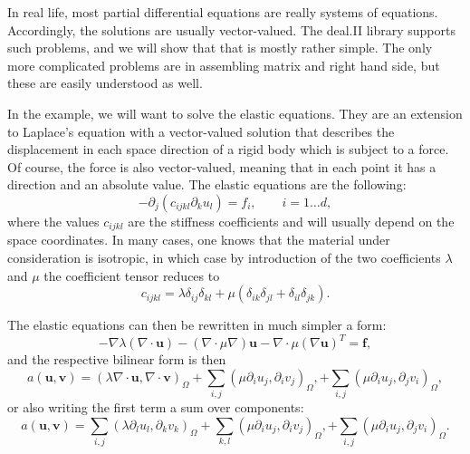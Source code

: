 \documentclass{article}
\renewcommand{\vec}[1]{{\mathbf #1}}
\renewcommand{\div}{\nabla \cdot}
\begin{document}
In real life, most partial differential equations are really systems
of equations. Accordingly, the solutions are usually
vector-valued. The deal.II library supports such problems, and we will show
that that is mostly rather simple. The only more complicated problems
are in assembling matrix and right hand side, but these are easily
understood as well. 

In the example, we will want to solve the elastic equations. They are
an extension to Laplace's equation with a vector-valued solution that
describes the displacement in each space direction of a rigid body
which is subject to a force. Of course, the force is also
vector-valued, meaning that in each point it has a direction and an
absolute value. The elastic equations are the following:
$$
  -
  \partial_j (c_{ijkl} \partial_k u_l)
  =
  f_i,
  \qquad
  i=1\ldots d,
$$
where the values $c_{ijkl}$ are the stiffness coefficients and
will usually depend on the space coordinates. In
many cases, one knows that the material under consideration is
isotropic, in which case by introduction of the two coefficients
$\lambda$ and $\mu$ the coefficient tensor reduces to
$$
  c_{ijkl} 
  =
  \lambda \delta_{ij} \delta_{kl} + 
  \mu (\delta_{ik} \delta_{jl} + \delta_{il} \delta_{jk}).
$$

The elastic equations can then be rewritten in much simpler a form:
$$
   -
   \nabla \lambda (\div \vec u)
   -
   (\nabla \cdot \mu \nabla) \vec u
   -
   \div \mu (\nabla \vec u)^T
   =
   \vec f,
$$
and the respective bilinear form is then
$$
  a(\vec u, \vec v) =
  \left(
    \lambda \div \vec u, \div \vec v
  \right)_\Omega
  +
  \sum_{i,j}
  \left(
    \mu \partial_i u_j, \partial_i v_j
  \right)_\Omega,
  +
  \sum_{i,j}
  \left(
    \mu \partial_i u_j, \partial_j v_i
  \right)_\Omega,
$$
or also writing the first term a sum over components:
$$
  a(\vec u, \vec v) =
  \sum_{i,j}
  \left(
    \lambda \partial_l u_l, \partial_k v_k
  \right)_\Omega
  +
  \sum_{k,l}
  \left(
    \mu \partial_i u_j, \partial_i v_j
  \right)_\Omega,
  +
  \sum_{i,j}
  \left(
    \mu \partial_i u_j, \partial_j v_i
  \right)_\Omega.
$$
\end{document}
